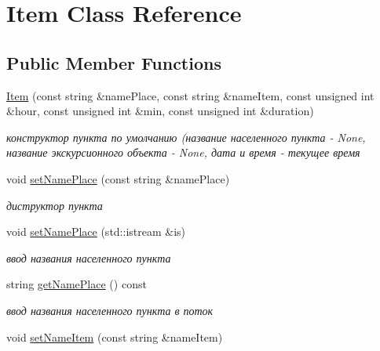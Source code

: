 \hypertarget{class_item}{}\section{Item Class Reference}
\label{class_item}
\subsection*{Public Member Functions}
\begin{DoxyCompactItemize}
\item 
\hyperlink{class_item_a92fbc538cf5a7e47e1129f33a6c53453}{Item} (const string \&name\+Place, const string \&name\+Item, const unsigned int \&hour, const unsigned int \&min, const unsigned int \&duration)
\begin{DoxyCompactList}\small\item\em конструктор пункта по умолчанию (название населенного пункта -\/ None, название экскурсионного объекта -\/ None, дата и время -\/ текущее время \end{DoxyCompactList}\item 
\hypertarget{class_item_a8bdb9e933891e13672b1979dbc51401d}{}void \hyperlink{class_item_a8bdb9e933891e13672b1979dbc51401d}{set\+Name\+Place} (const string \&name\+Place)\label{class_item_a8bdb9e933891e13672b1979dbc51401d}

\begin{DoxyCompactList}\small\item\em диструктор пункта \end{DoxyCompactList}\item 
\hypertarget{class_item_adb511922ae79a79c40f3542ae457fac4}{}void \hyperlink{class_item_adb511922ae79a79c40f3542ae457fac4}{set\+Name\+Place} (std\+::istream \&is)\label{class_item_adb511922ae79a79c40f3542ae457fac4}

\begin{DoxyCompactList}\small\item\em ввод названия населенного пункта \end{DoxyCompactList}\item 
\hypertarget{class_item_a18f8c9c7e6fc0a2326d75b7c1857bc51}{}string \hyperlink{class_item_a18f8c9c7e6fc0a2326d75b7c1857bc51}{get\+Name\+Place} () const \label{class_item_a18f8c9c7e6fc0a2326d75b7c1857bc51}

\begin{DoxyCompactList}\small\item\em ввод названия населенного пункта в поток \end{DoxyCompactList}\item 
\hypertarget{class_item_af7bca1854d89b1d7315cf9b37ec41aec}{}void \hyperlink{class_item_af7bca1854d89b1d7315cf9b37ec41aec}{set\+Name\+Item} (const string \&name\+Item)\label{class_item_af7bca1854d89b1d7315cf9b37ec41aec}


\end{DoxyCompactItemize}

